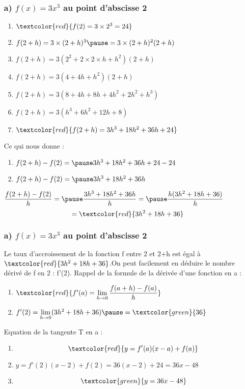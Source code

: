 \documentclass[t]{beamer}
\begin{document}
\begin{frame}
\frametitle{a) $f(x) = 3x^3$ au point d'abscisse 2}
\pause
\begin{enumerate}[]
\item \(\textcolor{red}{f(2) =  3 \times 2^3 = 24}\)
\pause
\item \(f(2+h) =  3 \times (2+h)^3 \pause = 3 \times (2+h)^2(2+h) \)
\pause
\item \(f(2+h) = 3(2^2 + 2 \times 2 \times h + h^2)(2+h)\)
\pause
\item \(f(2+h) = 3(4 + 4h + h^2)(2+h)\)
\pause
\item \(f(2+h) = 3(8 + 4h + 8h + 4h^2 + 2h^2 + h^3)\)
\pause
\item \(f(2+h) = 3(h^3 + 6h^2 + 12h + 8)\)
\pause
\item \(\textcolor{red}{f(2+h) = 3h^3 + 18h^2 + 36h + 24}\)
\pause
\end{enumerate}
\begin{block}{Ce qui nous donne :}
\pause
\begin{enumerate}[]
\item \(f(2+h) - f(2) = \pause 3h^3 + 18h^2 + 36h + 24 - 24 \)
\pause
\item \(f(2+h) - f(2) = \pause 3h^3 + 18h^2 + 36h \)

\end{enumerate}
\end{block}
\pause
\( \dfrac{f(2+h) - f(2)}{h} = \pause \dfrac{3h^3 + 18h^2 + 36h}{h} = \pause \dfrac{h(3h^2 + 18h + 36)}{h}\)
\pause
\[=\textcolor{red}{3h^2 + 18h + 36}\]
\end{frame}

\begin{frame}
\frametitle{a) $f(x) = 3x^3$ au point d'abscisse 2}
\pause
Le taux d'accroissement de la fonction f entre 2 et 2+h est égal à \pause $\textcolor{red}{3h^2 + 18h + 36}$.\pause On peut facilement en déduire le nombre dérivé de f \pause en 2 : f'(2).
\pause
Rappel de la formule de la dérivée d'une fonction en a : 
\pause
\begin{enumerate}[]
\item<+-> \(\textcolor{red}{f'(a) = \lim\limits_{h \rightarrow 0}\dfrac{f(a+h)-f(a)}{h}}\)
\item<+-> \(f'(2) = \lim\limits_{h \rightarrow 0} (3h^2 + 18h + 36) \pause = \textcolor{green}{36} \)
\pause
\end{enumerate}

Equation de la tangente T en a :
\pause
\begin{enumerate}[]
\item<+-> \[\textcolor{red}{y = f'(a)(x-a) + f(a)}\]
\item<+-> \(y=f'(2)(x-2) + f(2) = 36(x-2) + 24 = 36x -48 \)
\item<+-> \[\textcolor{green}{y = 36x -48} \]
\end{enumerate}
\end{frame}
\end{document}
